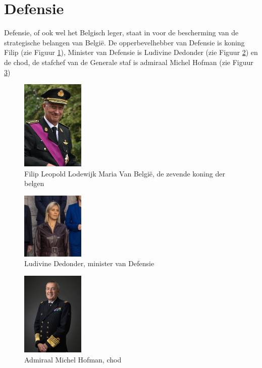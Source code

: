 
\section{Defensie}
\label{sec:defensie}

Defensie, of ook wel het Belgisch leger, staat in voor de bescherming van de strategische belangen van België. De opperbevelhebber van Defensie is koning Filip (zie Figuur \ref{fig:koning_filip}), Minister van Defensie is Ludivine Dedonder (zie Figuur \ref{fig:mod}) en de \gls{chod}, de stafchef van de Generale staf is admiraal Michel Hofman (zie Figuur \ref{fig:chod})~\autocite{Wikipedia2022a}

\begin{figure}
    \includegraphics[width=3cm]{img/koning_filip.jpg}
    \caption{\label{fig:koning_filip}Filip Leopold Lodewijk Maria Van België, de zevende koning der belgen~\autocite{Wikipedia2022}}
\end{figure}

\begin{figure}
    \includegraphics[width=3cm]{img/Ludivine_Dedonder.jpg}
    \caption{\label{fig:mod}Ludivine Dedonder, minister van Defensie~\autocite{Wikipedia2022c}}
\end{figure}

\begin{figure}
    \includegraphics[width=3cm]{img/michel_hofman.jpg}
    \caption{\label{fig:chod}Admiraal Michel Hofman, \gls{chod}~\autocite{Nato2020}}
\end{figure}

